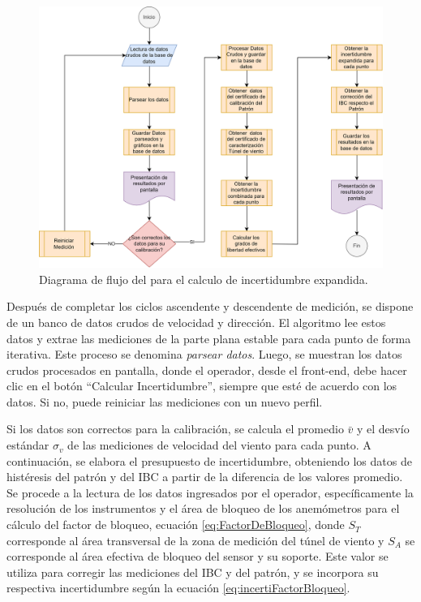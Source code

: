 \begin{figure}[H]
    \centering
    \includegraphics[width=0.9\linewidth]{Figuras/AplicacionWeb/backend/DiagramaFlujoCalculoIncertidumbre.png}
    \caption{Diagrama de flujo del para el calculo de incertidumbre expandida.}
    \label{fig:DiagramaFlujoCalculoIncertidumbre}
\end{figure}

Después de completar los ciclos ascendente y descendente de medición, se dispone de un banco de datos crudos de velocidad y dirección. El algoritmo lee estos datos y extrae las mediciones de la parte plana estable para cada punto de forma iterativa. Este proceso se denomina \textit{parsear datos}. Luego, se muestran los datos crudos procesados en pantalla, donde el operador, desde el front-end, debe hacer clic en el botón ``Calcular Incertidumbre'', siempre que esté de acuerdo con los datos. Si no, puede reiniciar las mediciones con un nuevo perfil.

Si los datos son correctos para la calibración, se calcula el promedio $\bar{v}$ y el desvío estándar $\sigma_{v}$ de las mediciones de velocidad del viento para cada punto. A continuación, se elabora el presupuesto de incertidumbre, obteniendo los datos de histéresis del patrón y del IBC a partir de la diferencia de los valores promedio. Se procede a la lectura de los datos ingresados por el operador, específicamente la resolución de los instrumentos y el área de bloqueo de los anemómetros para el cálculo del factor de bloqueo, ecuación \ref{eq:FactorDeBloqueo}, donde $S_{T}$ corresponde al área transversal de la zona de medición del túnel de viento y $S_{A}$ se corresponde al área efectiva de bloqueo del sensor y su soporte. Este valor se utiliza para corregir las mediciones del IBC y del patrón, y se incorpora su respectiva incertidumbre según la ecuación \ref{eq:incertiFactorBloqueo}.

